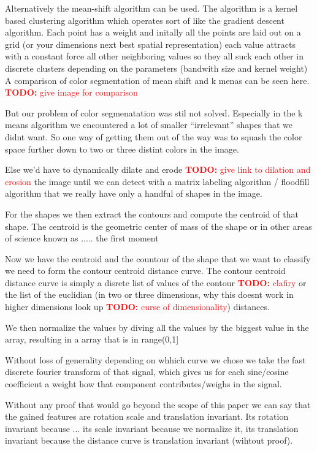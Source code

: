 \documentclass[journal]{vgtc}       %
\newcommand{\todo}[1]{\textcolor{red}{\textbf{TODO:} #1}}
\begin{document}
Alternatively the mean-shift algorithm can be used. The algorithm is a kernel based clustering algorithm which operates sort of like the gradient descent algorithm.
Each point has a weight and initally all the points are laid out on a grid (or your dimensions next best spatial representation) each value attracts with a constant force all other neighboring values so they all suck each other in discrete clusters depending on the parameters (bandwith size and kernel weight) A comparison of color segmentation of mean shift and  k menas can be seen here. \todo{give image for comparison}

But our problem of color segmenatation was stil not solved. Especially in the k means algorithm we encountered a lot of smaller ``irrelevant'' shapes that we didnt want.
So one way of getting them out of the way was to squash the color space further down to two or three distint colors in the image.

Else we'd have to dynamically dilate and erode \todo{give link to dilation and erosion} the image until we can detect with a matrix labeling algorithm /  floodfill algorithm that we really have only a handful of shapes in the image.

For the shapes we then extract the contours and compute the centroid of that shape.
The centroid is the geometric center of mass of the shape or in other areas of science known as ..... the first moment 

Now we have the centroid and the countour of the shape that we want to classify we need to form the contour centroid distance curve.
The contour centroid distance curve is simply a disrete list of values of the contour \todo{clafiry} or the list of the euclidian (in two or three dimensions, why this doesnt work in higher dimensions look up \todo{curse of dimensionality}) distances.

We then normalize the values by diving all the values by the biggest value in the array, resulting in a array that is in range(0,1]

Without loss of generality depending on whhich curve we chose we take the fast discrete fourier transform of that signal, which gives us for each sine/cosine coefficient a weight how that component contributes/weighs in the signal.

Without any proof that would go beyond the scope of this paper we can say that the gained features are rotation scale and translation invariant. Its rotation invariant because ... its scale invariant because we normalize it, its translation invariant because the distance curve is translation invariant (wihtout proof).
\end{document}

